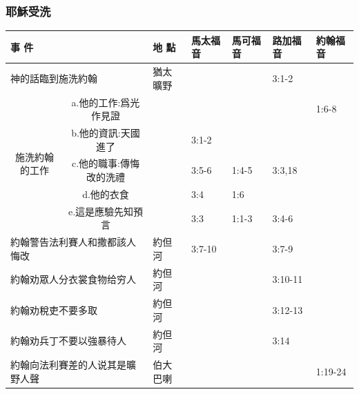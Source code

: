 \subsubsection{耶穌受洗}
\begin{table}[H]
  \centering 
    \begin{tabular}{p{7.645em}c|p{4.855em}|p{4.215em}|p{4.215em}|p{4.215em}|l}
    \toprule
    \multicolumn{2}{p{20.075em}|}{事 件} & 地 點   & 馬太福音  & 馬可福音  & 路加福音  & \multicolumn{1}{p{4.215em}}{約翰福音} \\ \midrule

\multicolumn{2}{p{20.075em}|}{神的話臨到施洗約翰} & 猶太曠野  & \multicolumn{1}{r|}{} & \multicolumn{1}{r|}{} & 3:1-2 &  \\ \midrule

\multicolumn{1}{c|}{\multirow{5}[10]{*}{施洗約翰的工作}} & \multicolumn{1}{p{13.43em}|}{a.他的工作:爲光作見證} & \multicolumn{1}{l|}{} & \multicolumn{1}{r|}{} & \multicolumn{1}{l|}{} & \multicolumn{1}{r|}{} & \multicolumn{1}{p{4.215em}}{1:6-8} \\
\cmidrule{2-7}    \multicolumn{1}{c|}{} & \multicolumn{1}{p{13.43em}|}{b.他的資訊:天國進了} & \multicolumn{1}{r|}{} & 3:1-2 & \multicolumn{1}{r|}{} & \multicolumn{1}{r|}{} &  \\
\cmidrule{2-7}    \multicolumn{1}{c|}{} & \multicolumn{1}{p{13.43em}|}{c.他的職事:傳悔改的洗禮} & \multicolumn{1}{r|}{} & 3:5-6 & 1:4-5 & \multicolumn{1}{l|}{3:3,18} &  \\
\cmidrule{2-7}    \multicolumn{1}{c|}{} & \multicolumn{1}{p{13.43em}|}{d.他的衣食} & \multicolumn{1}{r|}{} & \multicolumn{1}{l|}{3:4} & \multicolumn{1}{l|}{1:6} & \multicolumn{1}{r|}{} &  \\
\cmidrule{2-7}    \multicolumn{1}{c|}{} & \multicolumn{1}{p{13.43em}|}{e.這是應驗先知預言} & \multicolumn{1}{r|}{} & \multicolumn{1}{l|}{3:3} & 1:1-3 & 3:4-6 &  \\\midrule

    \multicolumn{2}{p{20.075em}|}{約翰警告法利賽人和撒都該人悔改} & 約但河   & 3:7-10 & \multicolumn{1}{r|}{} & 3:7-9&  \\ \midrule

 \multicolumn{2}{p{20.075em}|}{約翰劝眾人分衣裳食物给穷人} & 約但河   &  & \multicolumn{1}{r|}{} & 3:10-11 &  \\ \midrule
\multicolumn{2}{p{20.075em}|}{約翰劝稅吏不要多取} & 約但河   &  & \multicolumn{1}{r|}{} & 3:12-13&  \\ \midrule
\multicolumn{2}{p{20.075em}|}{約翰劝兵丁不要以強暴待人} & 約但河   &  & \multicolumn{1}{r|}{} & 3:14&  \\ \midrule
\multicolumn{2}{p{20.075em}|}{約翰向法利賽差的人说其是曠野人聲} & 伯大巴喇   & & &  & 1:19-24 \\  \midrule


\end{tabular}
\end{table}
